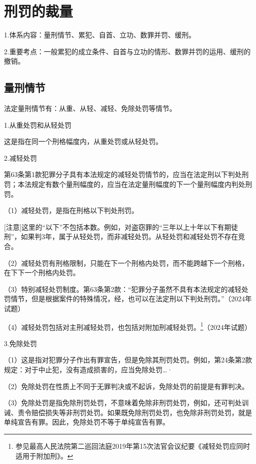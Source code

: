 \chapter{刑罚的裁量}

\begin{EditionOpeningPanel}
1.体系内容：量刑情节、累犯、自首、立功、数罪并罚、缓刑。

2.重要考点：一般累犯的成立条件、自首与立功的情形、数罪并罚的运用、缓刑的撤销。
\end{EditionOpeningPanel}

\section{量刑情节}

法定量刑情节有：从重、从轻、减轻、免除处罚等情节。

1.从重处罚和从轻处罚

这是指在同一个刑格幅度内，从重处罚或从轻处罚。

2.减轻处罚

第63条第1款犯罪分子具有本法规定的减轻处罚情节的，应当在法定刑以下判处刑罚；本法规定有数个量刑幅度的，应当在法定量刑幅度的下一个量刑幅度内判处刑罚。

（1）减轻处罚，是指在刑格以下判处刑罚。

[注意]这里的“以下”不包括本数。例如，对盗窃罪的“三年以上十年以下有期徒刑”，如果判3年，属于从轻处罚，而非减轻处罚。从轻处罚和减轻处罚不存在竞合。

（2）减轻处罚有刑格限制，只能在下一个刑格内处罚，而不能跨越下一个刑格，在下下一个刑格内处罚。

（3）特别减轻处罚制度。第63条第2款：“犯罪分子虽然不具有本法规定的减轻处罚情节，但是根据案件的特殊情况，经，也可以在法定刑以下判处刑罚。”（2024年试题）

（4）减轻处罚包括对主刑减轻处罚，也包括对附加刑减轻处罚。\footnote{参见最高人民法院第二巡回法庭2019年第15次法官会议纪要《减轻处罚应同时适用于附加刑》。}（2024年试题）

3.免除处罚

（1）这是指对犯罪分子作出有罪宣告，但是免除其刑罚处罚。例如，第24条第2款规定：对于中止犯，没有造成损害的，应当免除处罚…·

（2）免除处罚在性质上不同于无罪判决或不起诉，免除处罚的前提是有罪判决。

（3）免除处罚是指免除刑罚处罚，不意味着免除非刑罚处罚，例如，还可判处训诫、责令赔偿损失等非刑罚处罚。如果既免除刑罚处罚，也免除非刑罚处罚，就是单纯宣告有罪。因此，免除处罚不等于单纯宣告有罪。

